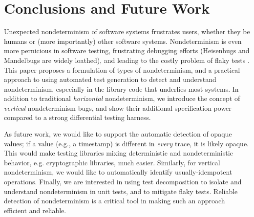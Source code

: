 \section{Conclusions and Future Work}

Unexpected nondeterminism of software systems frustrates users,
whether they be humans or (more importantly) other software systems.
Nondeterminism is even more pernicious in software testing,
frustrating debugging efforts (Heisenbugs \cite{Heisenbug} and
Mandelbugs \cite{GrottkeBugs,FaultTriggers} are widely loathed), and
leading to the costly problem of flaky tests
\cite{miccoflaky,listfieldtestanalysis}.
This paper proposes a formulation of types of nondeterminism, and a
practical approach to using automated test generation to detect and understand
nondeterminism, especially in the library code that underlies most
systems. In addition to traditional \emph{horizontal} nondeterminism, we introduce
the concept of \emph{vertical} nondeterminism bugs, and show their
additional specification power compared to a
strong differential testing harness.  
\begin{comment}
We implemented our approach in the
TSTL automated test generation system for Python, and demonstrated the
simplicity and utility of the approach on real-world examples.
\end{comment}

As future work, we would like to support the automatic detection of opaque
values; if a value (e.g., a timestamp) is different in \emph{every}
trace, it is likely opaque.  This would make
testing libraries mixing deterministic and nondeterministic
behavior, e.g. cryptographic libraries, much easier. Similarly, for
vertical nondeterminism, we would like to
automatically identify usually-idempotent operations.
Finally, we are interested in using test decomposition
\cite{Composition} to isolate and understand
nondeterminism in unit tests, and to mitigate flaky tests.
Reliable detection of nondeterminism is a critical tool in making such
an approach efficient and reliable.

